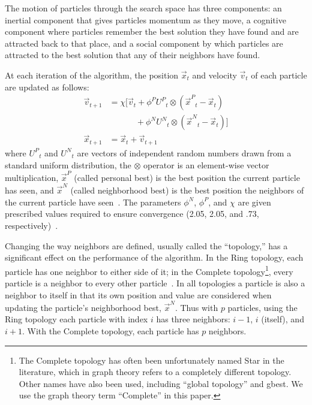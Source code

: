 \documentclass[smallcondensed]{svjour3}
\providecommand{\pers}{\ensuremath{P}}
\providecommand{\neigh}{\ensuremath{N}}
\providecommand{\nURand}{\ensuremath{U^\neigh}}
\providecommand{\pURand}{\ensuremath{U^\pers}}
\providecommand{\ppos}{\ensuremath{\Vec{x}}}
\providecommand{\pvel}{\ensuremath{\Vec{v}}}
\providecommand{\nbest}{\ensuremath{\Vec{x}^\neigh}}
\providecommand{\pbest}{\ensuremath{\Vec{x}^\pers}}
\providecommand{\constriction}{\ensuremath{\chi}}
\providecommand{\ncoeff}{\ensuremath{\phi^\neigh}}
\providecommand{\pcoeff}{\ensuremath{\phi^\pers}}
\begin{document}
The motion of particles through the search space has three components: an
inertial component that gives particles momentum as they move, a cognitive
component where particles remember the best solution they have found and are
attracted back to that place, and a social component by which particles are
attracted to the best solution that any of their neighbors have found.

At each iteration of the algorithm, the position $\ppos_t$ and velocity
$\pvel_t$ of each particle are updated as follows:
\begin{align}
\nonumber
	\pvel_{t+1} &=
		\constriction \bigl[ \pvel_t
			+ \pcoeff\pURand_{t}\otimes(\pbest_{t} - \ppos_{t}) \\
\label{eq:velupdate}
			& \quad \quad \quad \, + \ncoeff\nURand_{t}\otimes(\nbest_{t} - \ppos_{t})
		\bigr] \\
\label{eq:posupdate}
	\ppos_{t+1} &= \ppos_{t} + \pvel_{t+1}
\end{align}
where \( \pURand_{t} \) and \( \nURand_{t} \) are vectors of independent random
numbers drawn from a standard uniform distribution, the \( \otimes \) operator
is an element-wise vector multiplication, $\pbest$ (called personal best) is
the best position the current particle has seen, and $\nbest$ (called
neighborhood best) is the best position the neighbors of the current particle
have seen~\citep{bratton-2007-defining-a-standard-for-pso}.  The parameters \(
\ncoeff \), \( \pcoeff \), and \( \constriction \) are given prescribed values
required to ensure convergence (2.05, 2.05, and .73,
respectively)~\citep{clerc-2002-constricted-pso}. 

Changing the way neighbors are defined, usually called the ``topology,'' has a
significant effect on the performance of the algorithm.  In the Ring topology,
each particle has one neighbor to either side of it; in the Complete
topology\footnote{The Complete topology has often been unfortunately named Star
in the literature, which in graph theory refers to a completely different
topology.  Other names have also been used, including ``global topology'' and
gbest.  We use the graph theory term ``Complete'' in this paper.}, every
particle is a neighbor to every other
particle~\citep{bratton-2007-defining-a-standard-for-pso}.  In all topologies a
particle is also a neighbor to itself in that its own position and value are
considered when updating the particle's neighborhood best, $\nbest$.  Thus with
$p$ particles, using the Ring topology each particle with index $i$ has three
neighbors: $i-1$, $i$ (itself), and $i+1$.  With the Complete topology, each
particle has $p$ neighbors.
\end{document}
